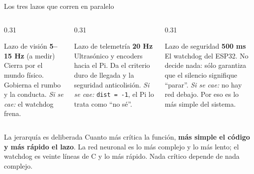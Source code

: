 \documentclass[aspectratio=169,10pt]{beamer}
\begin{document}
\begin{frame}{Los tres lazos que corren en paralelo}
  \begin{columns}[T,onlytextwidth]
    \begin{column}{0.31\textwidth}
      \begin{block}{\textcolor{azul}{Lazo de visión}}
        \small
        \textbf{5--15 Hz} (a medir)\newline
        Cierra por el mundo físico.\newline
        Gobierna el rumbo y la conducta.
        \vspace{0.3em}\newline
        \emph{Si se cae:} el watchdog frena.
      \end{block}
    \end{column}
    \begin{column}{0.31\textwidth}
      \begin{block}{\textcolor{naranja}{Lazo de telemetría}}
        \small
        \textbf{20 Hz}\newline
        Ultrasónico y encoders hacia el Pi.\newline
        Da el criterio duro de llegada y la seguridad anticolisión.
        \vspace{0.3em}\newline
        \emph{Si se cae:} \texttt{dist = -1}, el Pi lo trata como ``no sé''.
      \end{block}
    \end{column}
    \begin{column}{0.31\textwidth}
      \begin{block}{\textcolor{critico}{Lazo de seguridad}}
        \small
        \textbf{500 ms}\newline
        El watchdog del ESP32.\newline
        No decide nada: sólo garantiza que el silencio signifique ``parar''.
        \vspace{0.3em}\newline
        \emph{Si se cae:} no hay red debajo. Por eso es lo más simple del sistema.
      \end{block}
    \end{column}
  \end{columns}

  \vspace{0.8em}
  \begin{alertblock}{La jerarquía es deliberada}
    \small
    Cuanto más crítica la función, \textbf{más simple el código y más rápido el
    lazo}. La red neuronal es lo más complejo y lo más lento; el watchdog es
    veinte líneas de C y lo más rápido. Nada crítico depende de nada complejo.
  \end{alertblock}
\end{frame}
\end{document}
